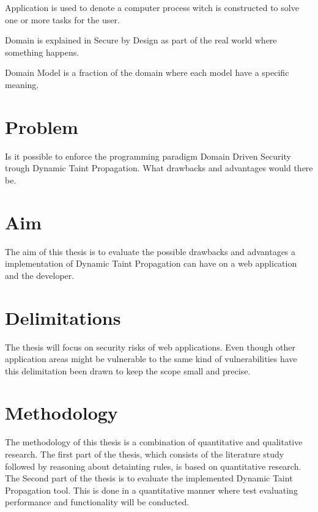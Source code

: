 \begin{definition}{Application} 
	is used to denote a computer process witch is constructed to solve one or more tasks for the user.
\end{definition}

\begin{definition}{Domain}
	is explained in Secure by Design \parencite{sbd2018} as part of the real world where something happens.
\end{definition}

\begin{definition}{Domain Model}
	is a fraction of the domain where each model have a specific meaning.
\end{definition}


\section{Problem}
Is it possible to enforce the programming paradigm Domain Driven Security trough Dynamic Taint Propagation. What drawbacks and advantages would there be.  


\section{Aim}
The aim of this thesis is to evaluate the possible drawbacks and advantages a implementation of Dynamic Taint Propagation can have on a web application and the developer.


\section{Delimitations}
The thesis will focus on security risks of web applications. Even though other application areas might be vulnerable to the same kind of vulnerabilities have this delimitation been drawn to keep the scope small and precise.


\section{Methodology}
The methodology of this thesis is a combination of quantitative and qualitative research. The first part of the thesis, which consists of the literature study followed by reasoning about detainting rules, is based on quantitative research. The Second part of the thesis is to evaluate the implemented Dynamic Taint Propagation tool. This is done in a quantitative manner where test evaluating performance and functionality will be conducted.
